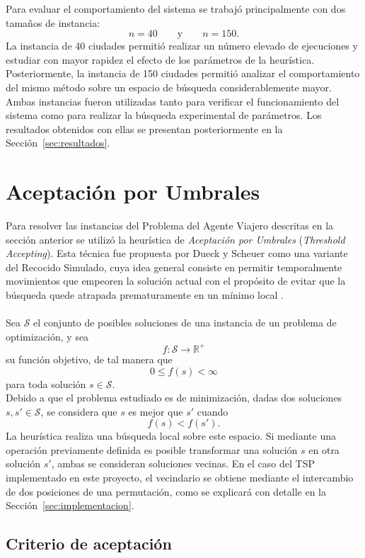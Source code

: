 \documentclass[12pt]{article}
\begin{document}
Para evaluar el comportamiento del sistema se trabajó principalmente con
dos tamaños de instancia:
\[
    n=40
    \qquad\text{y}\qquad
    n=150.
\]
La instancia de 40 ciudades permitió realizar un número elevado de
ejecuciones y estudiar con mayor rapidez el efecto de los parámetros de la
heurística. Posteriormente, la instancia de 150 ciudades permitió analizar
el comportamiento del mismo método sobre un espacio de búsqueda
considerablemente mayor.
\\
Ambas instancias fueron utilizadas tanto para verificar el funcionamiento
del sistema como para realizar la búsqueda experimental de parámetros. Los
resultados obtenidos con ellas se presentan posteriormente en la
Sección~\ref{sec:resultados}.

\section{Aceptación por Umbrales}
\label{sec:aceptacion-umbrales}

Para resolver las instancias del Problema del Agente Viajero descritas en la
sección anterior se utilizó la heurística de \emph{Aceptación por Umbrales}
(\textit{Threshold Accepting}). Esta técnica fue propuesta por Dueck y
Scheuer como una variante del Recocido Simulado, cuya idea general consiste
en permitir temporalmente movimientos que empeoren la solución actual con
el propósito de evitar que la búsqueda quede atrapada prematuramente en un
mínimo local \cite{dueck1990threshold}.
\\\\
Sea
\(\mathcal{S}\) el conjunto de posibles soluciones de una instancia de un
problema de optimización, y sea
\[  f:\mathcal{S}\longrightarrow\mathbb{R}^{+}
\]
su función objetivo, de tal manera que
\[
    0\leq f(s)<\infty
\]
para toda solución \(s\in\mathcal{S}\). \\ Debido a que el problema estudiado
es de minimización, dadas dos soluciones \(s,s'\in\mathcal{S}\), se
considera que \(s\) es mejor que \(s'\) cuando
\[
    f(s)<f(s').
\]
La heurística realiza una búsqueda local sobre este espacio. Si mediante una
operación previamente definida es posible transformar una solución \(s\) en
otra solución \(s'\), ambas se consideran soluciones vecinas. En el caso del
TSP implementado en este proyecto, el vecindario se obtiene mediante el
intercambio de dos posiciones de una permutación, como se explicará con
detalle en la Sección~\ref{sec:implementacion}.

\subsection{Criterio de aceptación}
\label{subsec:criterio-aceptacion}
\end{document}
